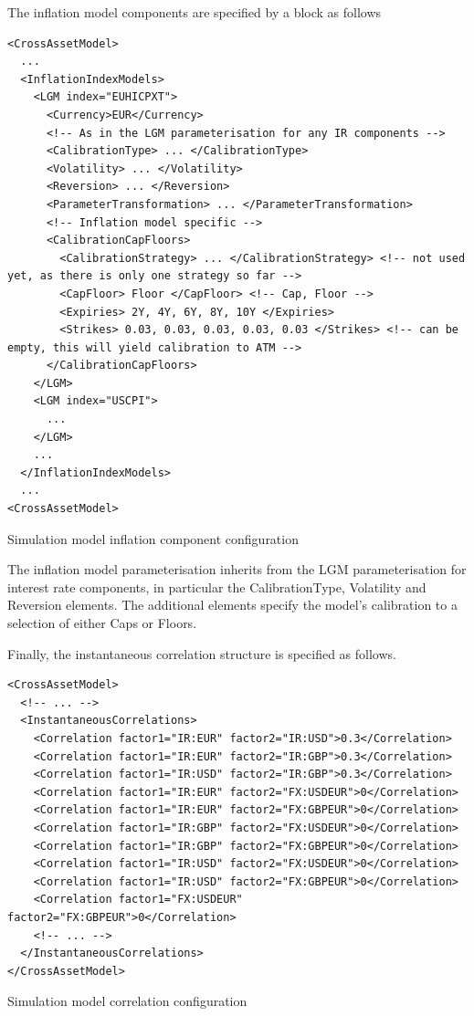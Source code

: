 \documentclass[12pt, a4paper]{article}
\begin{document}
\medskip
The inflation model components are specified by a block as follows

\begin{listing}[H]
\begin{verbatim}
<CrossAssetModel>	
  ...
  <InflationIndexModels>
    <LGM index="EUHICPXT">
      <Currency>EUR</Currency>
      <!-- As in the LGM parameterisation for any IR components -->
      <CalibrationType> ... </CalibrationType>
      <Volatility> ... </Volatility>
      <Reversion> ... </Reversion> 
      <ParameterTransformation> ... </ParameterTransformation>
      <!-- Inflation model specific -->
      <CalibrationCapFloors>
        <CalibrationStrategy> ... </CalibrationStrategy> <!-- not used yet, as there is only one strategy so far -->
        <CapFloor> Floor </CapFloor> <!-- Cap, Floor -->
        <Expiries> 2Y, 4Y, 6Y, 8Y, 10Y </Expiries>
        <Strikes> 0.03, 0.03, 0.03, 0.03, 0.03 </Strikes> <!-- can be empty, this will yield calibration to ATM -->
      </CalibrationCapFloors>
    </LGM>
    <LGM index="USCPI">
      ...
    </LGM>
    ...
  </InflationIndexModels>
  ...
<CrossAssetModel>	
\end{verbatim}
\caption{Simulation model inflation component configuration}
\label{lst:simulation_model_inflation_configuration}
\end{listing}

The inflation model parameterisation inherits from the LGM parameterisation for interest rate components, in particular the CalibrationType, Volatility and Reversion elements.  The additional elements specify the model's calibration to a selection of either Caps or Floors.

\medskip
Finally, the instantaneous correlation structure is specified as follows.

\begin{listing}[H]
\begin{verbatim}
<CrossAssetModel>	
  <!-- ... -->
  <InstantaneousCorrelations>
    <Correlation factor1="IR:EUR" factor2="IR:USD">0.3</Correlation>
    <Correlation factor1="IR:EUR" factor2="IR:GBP">0.3</Correlation>
    <Correlation factor1="IR:USD" factor2="IR:GBP">0.3</Correlation>
    <Correlation factor1="IR:EUR" factor2="FX:USDEUR">0</Correlation>
    <Correlation factor1="IR:EUR" factor2="FX:GBPEUR">0</Correlation>
    <Correlation factor1="IR:GBP" factor2="FX:USDEUR">0</Correlation>
    <Correlation factor1="IR:GBP" factor2="FX:GBPEUR">0</Correlation>
    <Correlation factor1="IR:USD" factor2="FX:USDEUR">0</Correlation>
    <Correlation factor1="IR:USD" factor2="FX:GBPEUR">0</Correlation>
    <Correlation factor1="FX:USDEUR" factor2="FX:GBPEUR">0</Correlation>
    <!-- ... --> 
  </InstantaneousCorrelations>
</CrossAssetModel>
\end{verbatim}
\caption{Simulation model correlation configuration}
\label{lst:simulation_model_correlation_configuration}
\end{listing}
\end{document}
